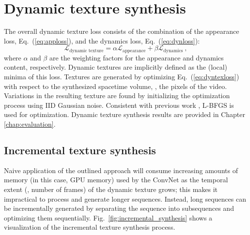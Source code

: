 \section{Dynamic texture synthesis}\label{sec:texgen}
The overall dynamic texture loss consists of the combination of the appearance loss, Eq.\ (\ref{eq:apploss}),
and the dynamics loss, Eq.\ (\ref{eq:dynloss}):
\begin{equation}
   \mathcal{L}_\text{dynamic texture} = \alpha\mathcal{L}_\text{appearance} + \beta \mathcal{L}_\text{dynamics}\ , \label{eq:dyntexloss}
\end{equation}
where $\alpha$ and $\beta$ are the weighting factors for the
appearance and dynamics content, respectively. 
Dynamic textures are implicitly defined as the (local) minima 
of this loss.
Textures are generated by optimizing Eq.\ 
(\ref{eq:dyntexloss}) with respect to the synthesized spacetime volume,
\ie, the pixels of the video.
Variations in the resulting texture are found by initializing the
optimization process using IID Gaussian noise.
Consistent with previous work \cite{gatys2015}, L-BFGS \cite{liu1989} is used for optimization. Dynamic texture synthesis results are provided in Chapter \ref{chap:evaluation}.

\subsection{Incremental texture synthesis}\label{sec:incremental_synthesis}

Naive application of the outlined approach will consume
increasing amounts of memory (in this case, GPU memory) used by the ConvNet as the temporal extent (\ie, number of frames) of the 
dynamic texture grows; this \highlight{fact} makes it impractical to process and generate longer sequences.
Instead, long sequences can be incrementally generated by
separating the sequence into subsequences and optimizing them 
sequentially. Fig.\ \ref{fig:incremental_synthesis}
shows a visualization of the incremental texture synthesis process.


